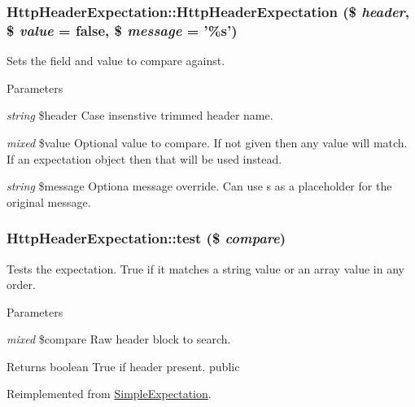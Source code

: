 \hypertarget{class_http_header_expectation_aefc6e91171518d01a9b2dbc0a9885fcb}{
\subsubsection[{HttpHeaderExpectation}]{\setlength{\rightskip}{0pt plus 5cm}HttpHeaderExpectation::HttpHeaderExpectation (\$ {\em header}, \/  \$ {\em value} = {\ttfamily false}, \/  \$ {\em message} = {\ttfamily '\%s'})}}
\label{class_http_header_expectation_aefc6e91171518d01a9b2dbc0a9885fcb}
Sets the field and value to compare against. 
\begin{DoxyParams}{Parameters}
\item[{\em string}]\$header Case insenstive trimmed header name. \item[{\em mixed}]\$value Optional value to compare. If not given then any value will match. If an expectation object then that will be used instead. \item[{\em string}]\$message Optiona message override. Can use s as a placeholder for the original message. \end{DoxyParams}
\hypertarget{class_http_header_expectation_a22d6de67c863d5f596a90b64b4989637}{
\subsubsection[{test}]{\setlength{\rightskip}{0pt plus 5cm}HttpHeaderExpectation::test (\$ {\em compare})}}
\label{class_http_header_expectation_a22d6de67c863d5f596a90b64b4989637}
Tests the expectation. True if it matches a string value or an array value in any order. 
\begin{DoxyParams}{Parameters}
\item[{\em mixed}]\$compare Raw header block to search. \end{DoxyParams}
\begin{DoxyReturn}{Returns}
boolean True if header present.  public 
\end{DoxyReturn}


Reimplemented from \hyperlink{class_simple_expectation_aa2b98f827e7487ebe12cedb9ad39d061}{SimpleExpectation}.

